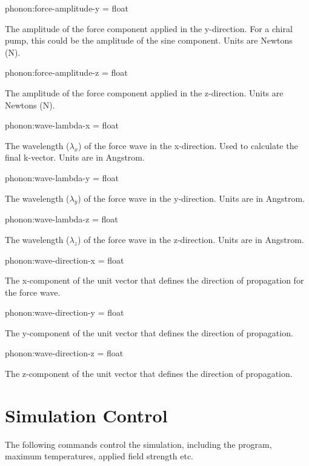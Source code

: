 {\zicf phonon:force-amplitude-y = float}
The amplitude of the force component applied in the y-direction. For a chiral pump, this could be the amplitude of the sine component. Units are Newtons (N).

{\zicf phonon:force-amplitude-z = float}
The amplitude of the force component applied in the z-direction. Units are Newtons (N).

{\zicf phonon:wave-lambda-x = float}
The wavelength ($\lambda_x$) of the force wave in the x-direction. Used to calculate the final k-vector. Units are in Angstrom.

{\zicf phonon:wave-lambda-y = float}
The wavelength ($\lambda_y$) of the force wave in the y-direction. Units are in Angstrom.

{\zicf phonon:wave-lambda-z = float}
The wavelength ($\lambda_z$) of the force wave in the z-direction. Units are in Angstrom.

{\zicf phonon:wave-direction-x = float} The x-component of the unit vector that defines the direction of propagation for the force wave.

{\zicf phonon:wave-direction-y = float} The y-component of the unit vector that defines the direction of propagation.

{\zicf phonon:wave-direction-z = float} The z-component of the unit vector that defines the direction of propagation.







\section*{Simulation Control}
The following commands control the simulation, including the program, maximum temperatures, applied field strength etc.

